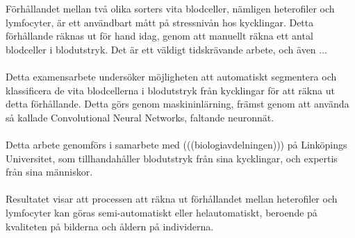 Förhållandet mellan två olika sorters vita blodceller, nämligen heterofiler och lymfocyter, är ett användbart mått på stressnivån hos kycklingar. Detta förhållande räknas ut för hand idag, genom att manuellt räkna ett antal blodceller i blodutstryk. Det är ett väldigt tidskrävande arbete, och även ...\\\\
Detta examensarbete undersöker möjligheten att automatiskt segmentera och klassificera de vita blodcellerna i blodutstryk från kycklingar för att räkna ut detta förhållande. Detta görs genom maskininlärning, främst genom att använda så kallade Convolutional Neural Networks, faltande neuronnät.\\\\
Detta arbete genomförs i samarbete med (((biologiavdelningen))) på Linköpings Universitet, som tillhandahåller blodutstryk från sina kycklingar, och expertis från sina människor.\\\\
Resultatet visar att processen att räkna ut förhållandet mellan heterofiler och lymfocyter kan göras semi-automatiskt eller helautomatiskt, beroende på kvaliteten på bilderna och åldern på individerna.